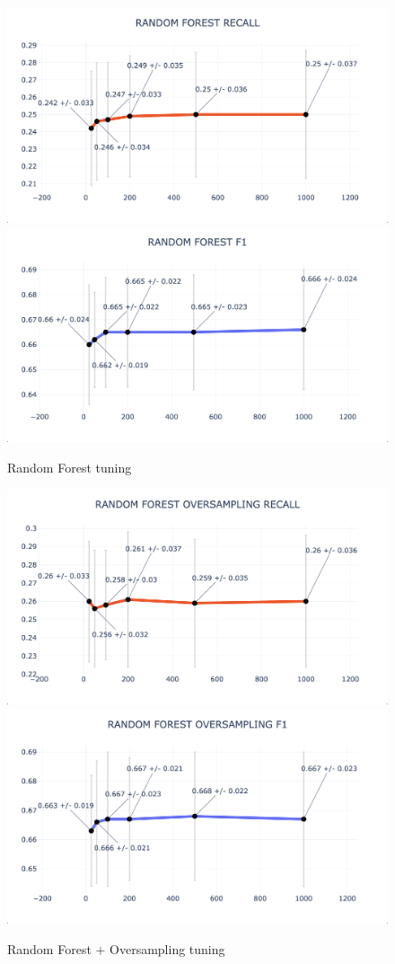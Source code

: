 \documentclass{article}
\begin{document}
	\begin{figure}[H]
		\centering
		\includegraphics[width=.49\textwidth]{clf_img/RF_recall.png}
		\includegraphics[width=.49\textwidth]{clf_img/RF_f1.png}
		\caption{Random Forest tuning}
		\label{fig:hyper_rf}
	\end{figure}
	
	\begin{figure}[H]
		\centering
		\includegraphics[width=.49\textwidth]{clf_img/RF_OS_recall.png}
		\includegraphics[width=.49\textwidth]{clf_img/RF_OS_f1.png}
		\caption{Random Forest + Oversampling tuning}
		\label{fig:hyper_rf_os}
	\end{figure}
	
\end{document}
